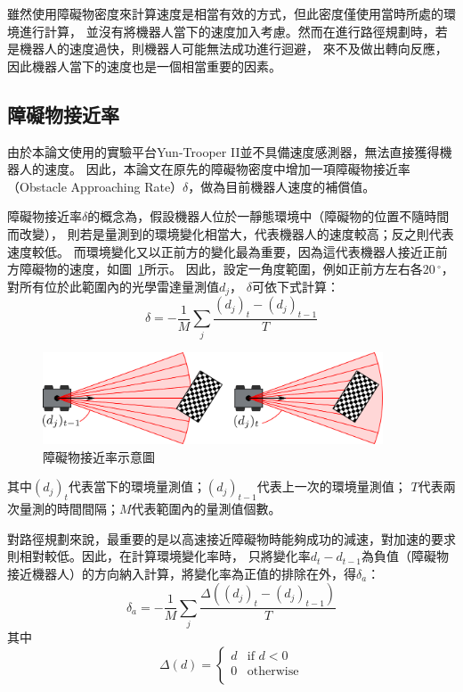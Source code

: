 雖然使用障礙物密度來計算速度是相當有效的方式，但此密度僅使用當時所處的環境進行計算，
並沒有將機器人當下的速度加入考慮。然而在進行路徑規劃時，若是機器人的速度過快，則機器人可能無法成功進行迴避，
來不及做出轉向反應，因此機器人當下的速度也是一個相當重要的因素。

\subsection{障礙物接近率}
由於本論文使用的實驗平台Yun-Trooper II並不具備速度感測器，無法直接獲得機器人的速度。
因此，本論文在原先的障礙物密度中增加一項障礙物接近率（Obstacle Approaching Rate）$\delta$，做為目前機器人速度的補償值。

障礙物接近率$\delta$的概念為，假設機器人位於一靜態環境中（障礙物的位置不隨時間而改變），
則若是量測到的環境變化相當大，代表機器人的速度較高；反之則代表速度較低。
而環境變化又以正前方的變化最為重要，因為這代表機器人接近正前方障礙物的速度，如圖~\ref{f:OAR}所示。
因此，設定一角度範圍，例如正前方左右各$20\,^{\circ}$，對所有位於此範圍內的光學雷達量測值$d_j$，
$\delta$可依下式計算：
\begin{equation}
	\delta = -\frac{1}{M}\sum_{j}\frac{(d_j)_t - (d_j)_{t-1}}{T}
\end{equation}
\begin{figure}
	\centering
	\includegraphics[width=0.9\textwidth]{figures/algorithm/obstacle_approaching_rate}
	\caption{障礙物接近率示意圖}
	\label{f:OAR}
\end{figure}
其中$(d_j)_t$代表當下的環境量測值；$(d_j)_{t-1}$代表上一次的環境量測值；
$T$代表兩次量測的時間間隔；$M$代表範圍內的量測值個數。

對路徑規劃來說，最重要的是以高速接近障礙物時能夠成功的減速，對加速的要求則相對較低。因此，在計算環境變化率時，
只將變化率$d_t - d_{t-1}$為負值（障礙物接近機器人）的方向納入計算，將變化率為正值的排除在外，得$\delta_a$：
\begin{equation}
	\delta_a = -\frac{1}{M}\sum_{j}\frac{\Delta((d_j)_t - (d_j)_{t-1})}{T}
\end{equation}
其中
\begin{equation*}
	\Delta(d) = 
	\begin{cases}
		d	& \textrm{if } d < 0 \\
		0	& \textrm{otherwise} \\
	\end{cases}
\end{equation*}

